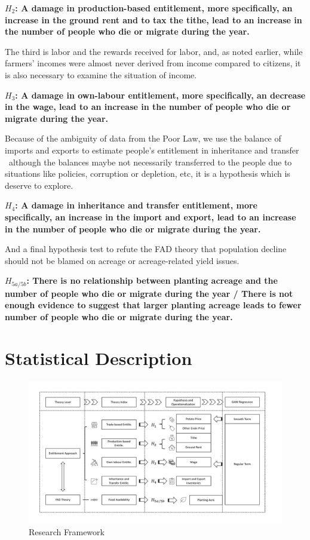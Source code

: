 \textbf{$H_2$: A damage in production-based entitlement, more specifically, an increase in the ground rent and to tax the tithe, lead to an increase in the number of people who die or migrate during the year.}

The third is labor and the rewards received for labor, and, as noted earlier, while farmers' incomes were almost never derived from income compared to citizens, it is also necessary to examine the situation of income.

\textbf{$H_3$: A damage in own-labour entitlement, more specifically, an decrease in the wage, lead to an increase in the number of people who die or migrate during the year.}

Because of the ambiguity of data from the Poor Law, we use the balance of imports and exports to estimate people's entitlement in inheritance and transfer \textemdash\
although the balances maybe not necessarily transferred to the people due to situations like policies, corruption or depletion, etc, it is a hypothesis which is deserve to explore.

\textbf{$H_4$: A damage in inheritance and transfer entitlement, more specifically, an increase in the import and export, lead to an increase in the number of people who die or migrate during the year.}

And a final hypothesis test to refute the FAD theory that population decline should not be blamed on acreage or acreage-related yield issues.

\textbf{$H_{5a/5b}$: There is no relationship between planting acreage and the number of people who die or migrate during the year / There is not enough evidence to suggest that larger planting acreage leads to fewer number of people who die or migrate during the year.}

\section{Statistical Description}

\begin{landscape}
\begin{figure}[htbp]
    \centering
    \caption{Research Framework}
    \includegraphics[width=1.5\textheight]{../03_outputs/Framework.pdf}
\end{figure}
\end{landscape}

